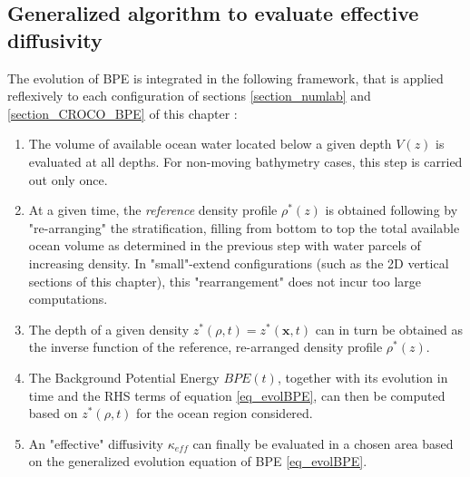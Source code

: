 \subsection{Generalized algorithm to evaluate effective diffusivity}
\label{BPE_algo}
The evolution of BPE is integrated in the following framework, that is applied reflexively to each configuration of sections \ref{section_numlab} and \ref{section_CROCO_BPE} of this chapter : 
\begin{enumerate}
\setlength\itemsep{0pt}
\item The volume of available ocean water located below a given depth $V(z)$ is evaluated at all depths. For non-moving bathymetry cases, this step is carried out only once. 
\item At a given time, the \textit{reference} density profile $\rho^*(z)$ is obtained following \citet{winters_available_1995} by "re-arranging" the stratification, filling from bottom to top the total available ocean volume as determined in the previous step with water parcels of increasing density. In "small"-extend configurations (such as the 2D vertical sections of this chapter), this "rearrangement" does not incur too large computations.%
\item The depth of a given density $z^*(\rho,t)=z^*(\mathbf{x},t)$ can in turn be obtained as the inverse function of the reference, re-arranged density profile $\rho^*(z)$. 
\item The Background Potential Energy $BPE(t)$, together with its evolution in time and the RHS terms of equation \ref{eq_evolBPE}, can then be computed based on $z^*(\rho,t)$ for the ocean region considered.
\item An "effective" diffusivity $\kappa_{eff}$ can finally be evaluated in a chosen area based on the generalized evolution equation of BPE \ref{eq_evolBPE}.
\end{enumerate}

